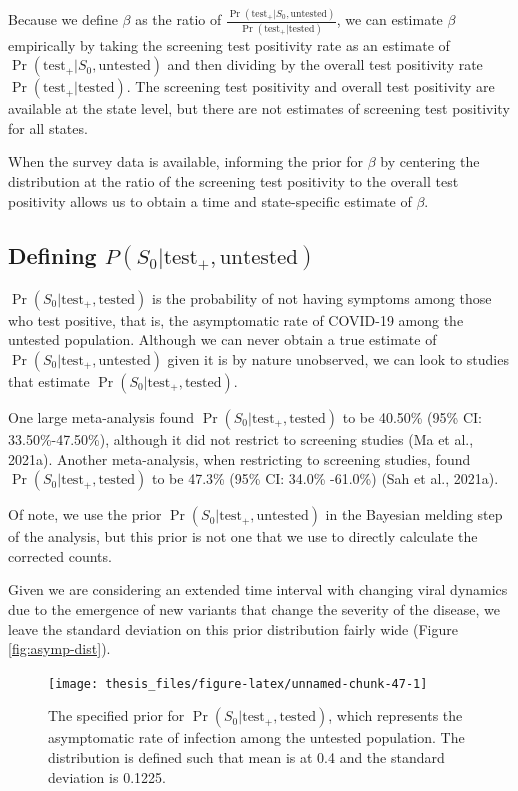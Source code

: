 \documentclass[12pt,twoside]{smiththesis}
\begin{document}
Because we define \(\beta\) as the ratio of \(\frac{\Pr(\text{test}_+ |S_0, \text{untested})}{\Pr(\text{test}_+|\text{tested})}\), we can estimate \(\beta\) empirically by taking the screening test positivity rate as an estimate of \(\Pr(\text{test}_+ |S_0, \text{untested})\) and then dividing by the overall test positivity rate \(\Pr(\text{test}_+|\text{tested})\). The screening test positivity and overall test positivity are available at the state level, but there are not estimates of screening test positivity for all states.

When the survey data is available, informing the prior for \(\beta\) by centering the distribution at the ratio of the screening test positivity to the overall test positivity allows us to obtain a time and state-specific estimate of \(\beta\).

\hypertarget{defining-ps_0texttest_textuntested}{%
\subsection{\texorpdfstring{Defining \(P(S_0|\text{test}_+,\text{untested})\)}{Defining P(S\_0\textbar\textbackslash text\{test\}\_+,\textbackslash text\{untested\})}}\label{defining-ps_0texttest_textuntested}}

\(\Pr(S_0|\text{test}_+,\text{tested})\) is the probability of not having symptoms among those who test positive, that is, the asymptomatic rate of COVID-19 among the untested population. Although we can never obtain a true estimate of \(\Pr(S_0|\text{test}_+,\text{untested})\) given it is by nature unobserved, we can look to studies that estimate \(\Pr(S_0|\text{test}_+,\text{tested})\).

One large meta-analysis found \(\Pr(S_0|\text{test}_+,\text{tested})\) to be 40.50\% (95\% CI: 33.50\%-47.50\%), although it did not restrict to screening studies (Ma et al., 2021a). Another meta-analysis, when restricting to screening studies, found \(\Pr(S_0|\text{test}_+,\text{tested})\) to be 47.3\% (95\% CI: 34.0\% -61.0\%) (Sah et al., 2021a).

Of note, we use the prior \(\Pr(S_0|\text{test}_+,\text{untested})\) in the Bayesian melding step of the analysis, but this prior is not one that we use to directly calculate the corrected counts.

Given we are considering an extended time interval with changing viral dynamics due to the emergence of new variants that change the severity of the disease, we leave the standard deviation on this prior distribution fairly wide (Figure \ref{fig:asymp-dist}).
\begin{figure}

{\centering \texttt{[image: thesis\_files/figure-latex/unnamed-chunk-47-1]} 

}

\caption{\label{fig:asymp-dist}The specified prior for $\Pr(S_0|\text{test}_+,\text{tested})$, which represents the asymptomatic rate of infection among the untested population. The distribution is defined such that mean is at 0.4 and the standard deviation is 0.1225.}\label{fig:unnamed-chunk-47}
\end{figure}
\newpage
\end{document}

